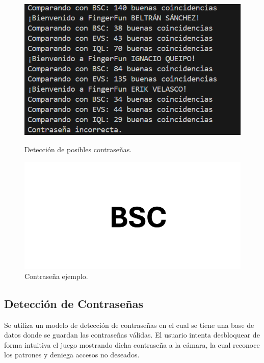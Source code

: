 \begin{figure}[H]
    \centering
    \begin{minipage}{0.45\textwidth} 
        \centering
        \includegraphics[width=\linewidth]{CAPS/CAP5.png}
        \caption{Detección de posibles contraseñas.}
        \label{fig:imagen1}
    \end{minipage}\hfill
    \begin{minipage}{0.45\textwidth} 
        \centering
        \includegraphics[width=\linewidth]{CAPS/CAP6.png}
        \caption{Contraseña ejemplo.}
        \label{fig:imagen2}
    \end{minipage}
\end{figure}

\subsection{Detección de Contraseñas}
Se utiliza un modelo de detección de contraseñas en el cual se tiene una base de datos donde se guardan las contraseñas válidas. El usuario intenta desbloquear de forma intuitiva el juego mostrando dicha contraseña a la cámara, la cual reconoce los patrones y deniega accesos no deseados. 


